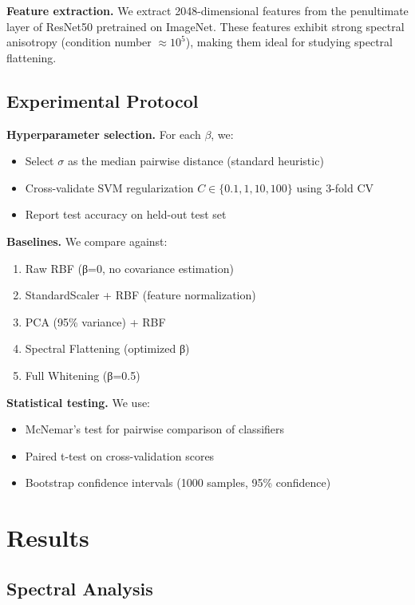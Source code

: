 \documentclass[11pt]{article}
\begin{document}
\textbf{Feature extraction.} We extract 2048-dimensional features from the penultimate layer of ResNet50 pretrained on ImageNet. These features exhibit strong spectral anisotropy (condition number $\approx 10^5$), making them ideal for studying spectral flattening.

\subsection{Experimental Protocol}

\textbf{Hyperparameter selection.} For each $\beta$, we:
\begin{itemize}
    \item Select $\sigma$ as the median pairwise distance (standard heuristic)
    \item Cross-validate SVM regularization $C \in \{0.1, 1, 10, 100\}$ using 3-fold CV
    \item Report test accuracy on held-out test set
\end{itemize}

\textbf{Baselines.} We compare against:
\begin{enumerate}
    \item Raw RBF (β=0, no covariance estimation)
    \item StandardScaler + RBF (feature normalization)
    \item PCA (95\% variance) + RBF
    \item Spectral Flattening (optimized β)
    \item Full Whitening (β=0.5)
\end{enumerate}

\textbf{Statistical testing.} We use:
\begin{itemize}
    \item McNemar's test for pairwise comparison of classifiers
    \item Paired t-test on cross-validation scores
    \item Bootstrap confidence intervals (1000 samples, 95\% confidence)
\end{itemize}

\section{Results}

\subsection{Spectral Analysis}
\end{document}
